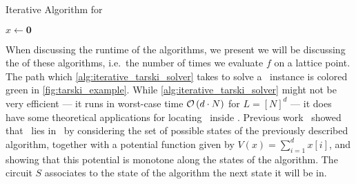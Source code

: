 \begin{algorithm}
	\caption{Iterative Algorithm for \Tarski}\label{alg:iterative_tarski_solver}
	$x \leftarrow \mathbf{0}$ \;
\end{algorithm}

When discussing the runtime of the algorithms, we present we will be discussing the  of these algorithms, i.e.\ the number of times we evaluate $f$ on a lattice point. The path which \cref{alg:iterative_tarski_solver} takes to solve a \Tarski\ instance is colored green in \cref{fig:tarski_example}. While \cref{alg:iterative_tarski_solver} might not be very efficient --- it runs in worst-case time $\mathcal{O}\left(d \cdot N\right)$ for $L = {[N]}^d$ --- it does have some theoretical applications for locating \Tarski\ inside \TFNP\@. Previous work~ showed that \Tarski\ lies in \PLS\ by considering the set of possible states of the previously described algorithm, together with a potential function given by $V(x) = \sum_{i=1}^{d}{x[i]}$, and showing that this potential is monotone along the states of the algorithm. The circuit $S$ associates to the state of the algorithm the next state it will be in.

